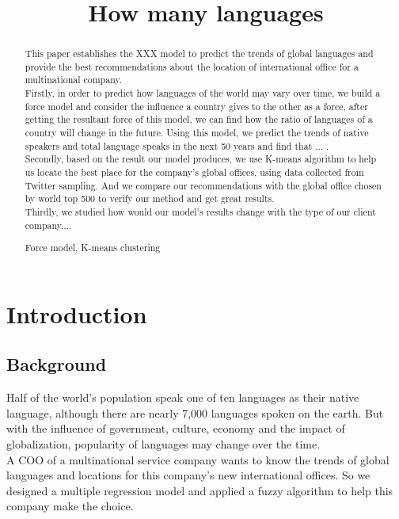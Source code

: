 \documentclass{mcmthesis}
\title {How many languages}
\date{}
\begin{document}
\begin{abstract}

  \indent This paper establishes the XXX model to predict the trends of global languages and provide the best recommendations about the location of international office for a multinational company.\\
  \indent Firstly, in order to predict how languages of the world may vary over time, we build a force model and consider the influence a country gives to the other as a force, after getting the resultant force of this model, we can find how the ratio of languages of a country will change in the future. Using this model, we predict the trends of native speakers and total language speaks in the next 50 years and find that ... .\\
  \indent Secondly, based on the result our model produces, we use K-means algorithm to help us locate the best place for the company's global offices, using data collected from Twitter sampling. And we compare our recommendations with the global office chosen by world top 500 to verify our method and get great results.\\
  \indent Thirdly, we studied how would our model's results change with the type of our client company....
\begin{keywords}
  Force model, K-means clustering
\end{keywords}
\end{abstract}
\maketitle
\pagestyle{empty}
\newpage
\tableofcontents
\setmainfont{Times New Roman}
\newpage
\pagestyle{fancy}
\setcounter{page}{1}
\section{Introduction}
\subsection{Background}
  \indent \indent Half of the world's population speak one of ten languages as their native language, although there are nearly 7,000 languages spoken on the earth. But with the influence of government, culture, economy and the impact of globalization, popularity of languages may change over the time. \\
  \indent A COO of a multinational service company wants to know the trends of global languages and locations for this company's new international offices. So we designed a multiple regression model and applied a fuzzy algorithm to help this company make the choice.
\end{document}
